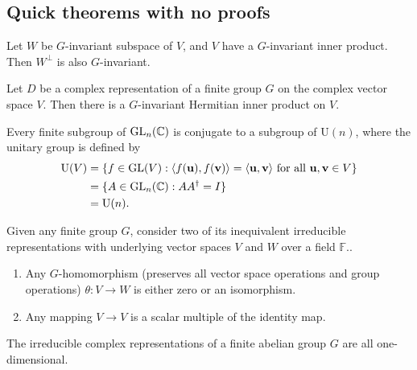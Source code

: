 \documentclass[a4paper]{article}
\begin{document}
\subsection{Quick theorems with no proofs}
\begin{prop}
  Let $W$ be $G$-invariant subspace of $V$, and $V$ have a $G$-invariant inner product. Then $W^\perp$ is also $G$-invariant.
\end{prop}
\begin{thm}
  Let $D$ be a complex representation of a finite group $G$ on the complex vector space $V$. Then there is a $G$-invariant Hermitian inner product on $V$.
\end{thm}
\begin{cor}
  Every finite subgroup of $\operatorname{GL}_n(\mathbb{C})$ is conjugate to a subgroup of $\text{U}(n)$, where the unitary group is defined by
\begin{align}
  \text{U}(V) &= \{f \in \operatorname{GL}(V): \langle f(\mathbf{u}), f(\mathbf{v})\rangle = \langle \mathbf{u}, \mathbf{v}\rangle \text{ for all }\mathbf{u}, \mathbf{v} \in V\}\nonumber\\
  &= \{A \in \operatorname{GL}_n(\mathbb{C}): AA^\dagger = I\}\nonumber\\
  &= \text{U}(n).
\end{align}
\end{cor}
\begin{thm}
Given any finite group $G$, consider two of its inequivalent irreducible representations with underlying vector spaces $V$ and $W$ over a field $\mathbb{F}$..
  \begin{enumerate}
    \item Any $G$-homomorphism (preserves all vector space operations and group operations) $\theta: V \rightarrow W$ is either zero or an isomorphism.
    \item Any mapping $V \rightarrow V$ is a scalar multiple of the identity map.
  \end{enumerate}
\end{thm}

\begin{cor}
  The irreducible complex representations of a finite abelian group $G$ are all one-dimensional.
\end{cor}
\end{document}
